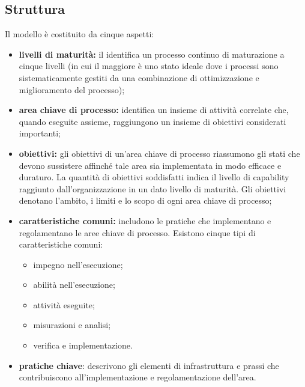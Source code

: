 \subsection{Struttura}
Il modello è costituito da cinque aspetti:
\begin{itemize}
\item  \textbf{livelli di maturità:} il  identifica un processo continuo di maturazione a cinque livelli (in cui il maggiore è uno stato ideale dove i processi sono sistematicamente gestiti da una combinazione di ottimizzazione e miglioramento del processo);

\item  \textbf{area chiave di processo:} identifica un insieme di attività correlate che, quando eseguite assieme, raggiungono un insieme di obiettivi considerati importanti;

\item  \textbf{obiettivi:} gli obiettivi di un'area chiave di processo riassumono gli stati che devono sussistere affinché tale area sia implementata in modo efficace e duraturo. La quantità di obiettivi soddisfatti indica il livello di capability raggiunto dall'organizzazione in un dato livello di maturità. Gli obiettivi denotano l’ambito, i limiti e lo scopo di ogni area chiave di processo;

\item  \textbf{caratteristiche comuni:} includono le pratiche che implementano e regolamentano le aree chiave di processo. Esistono cinque tipi di caratteristiche comuni:
\begin{itemize}
	\item impegno nell'esecuzione;
	\item abilità nell'esecuzione;
	\item attività eseguite;
	\item misurazioni e analisi;
	\item verifica e implementazione.
\end{itemize}

\item  \textbf{pratiche chiave}: descrivono gli elementi di infrastruttura e prassi che contribuiscono all'implementazione e regolamentazione dell'area. 
\end{itemize}

